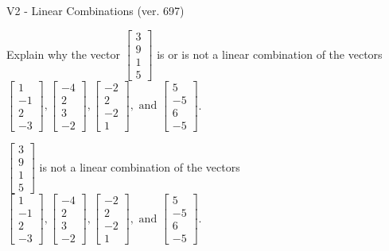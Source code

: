 \begin{exercise}
  \begin{exerciseTitle}V2 - Linear Combinations (ver. 697)\end{exerciseTitle}
  \begin{exerciseStatement}
    Explain why the vector \(\left[\begin{array}{c}
3 \\
9 \\
1 \\
5
\end{array}\right]\)  is or is not a linear 
	combination of the vectors \(\left[\begin{array}{c}
1 \\
-1 \\
2 \\
-3
\end{array}\right] , \left[\begin{array}{c}
-4 \\
2 \\
3 \\
-2
\end{array}\right] , \left[\begin{array}{c}
-2 \\
2 \\
-2 \\
1
\end{array}\right] , \text{ and } \left[\begin{array}{c}
5 \\
-5 \\
6 \\
-5
\end{array}\right]\).
	


  \end{exerciseStatement}
  \begin{exerciseAnswer}
   \(\left[\begin{array}{c}
3 \\
9 \\
1 \\
5
\end{array}\right]\) 
  	 is not  
	a linear combination of the vectors \(\left[\begin{array}{c}
1 \\
-1 \\
2 \\
-3
\end{array}\right] , \left[\begin{array}{c}
-4 \\
2 \\
3 \\
-2
\end{array}\right] , \left[\begin{array}{c}
-2 \\
2 \\
-2 \\
1
\end{array}\right] , \text{ and } \left[\begin{array}{c}
5 \\
-5 \\
6 \\
-5
\end{array}\right]\).


\end{exerciseAnswer}
\end{exercise}
